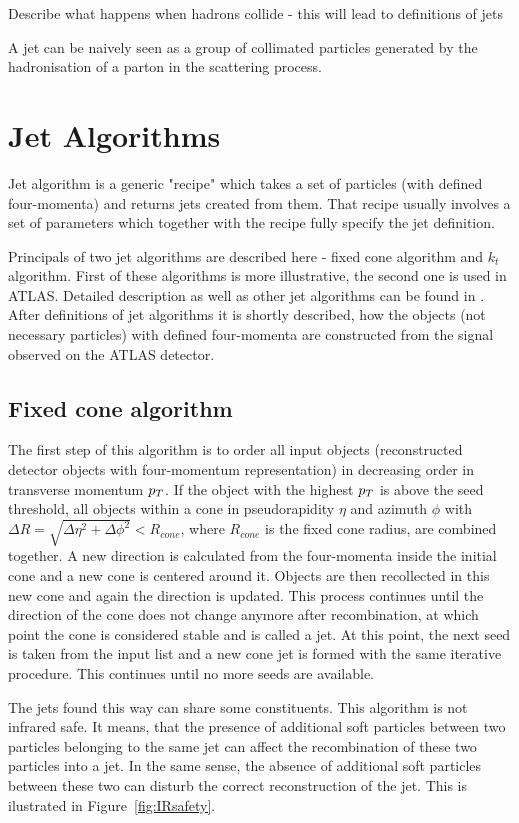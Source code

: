 Describe what happens when hadrons collide - this will lead to definitions of
jets

A jet can be naively seen as a group of collimated particles generated by the
hadronisation of a parton in the scattering process.

\section{Jet Algorithms}

Jet algorithm is a generic "recipe" which takes a set of particles (with defined
four-momenta) and returns jets created from them. That recipe usually involves a
set of parameters which together with the recipe fully specify the jet
definition. 

Principals of two jet algorithms are described here - fixed cone algorithm and
$k_t$ algorithm. First of these algorithms is more illustrative, the second one
is used in ATLAS. Detailed description as well as other jet algorithms can be
found in \cite{ATLASmain}. After definitions of jet algorithms it is shortly
described, how the objects (not necessary particles) with defined four-momenta
are constructed from the signal observed on the ATLAS detector. 

\subsection{Fixed cone algorithm}

The first step of this algorithm is to order all input objects (reconstructed
detector objects with four-momentum representation) in decreasing order in
transverse momentum $p_T$. If the object with the highest $p_T$ is above the
seed threshold, all objects within a cone in pseudorapidity $\eta$ and azimuth
$\phi$ with $\Delta R = \sqrt{\Delta \eta^2 + \Delta \phi^2} < R_{cone}$, where
$R_{cone}$ is the fixed cone radius, are combined together. A new direction is
calculated from the four-momenta inside the initial cone and a new cone is
centered around it. Objects are then recollected in this new cone and again the
direction is updated. This process continues until the direction of the cone
does not change anymore after recombination, at which point the cone is
considered stable and is called a jet. At this point, the next seed is taken
from the input list and a new cone jet is formed with the same iterative
procedure. This continues until no more seeds are available. 

The jets found this way can share some constituents. This algorithm is not
infrared safe. It means, that the presence of additional soft particles between
two particles belonging to the same jet can affect the recombination of these
two particles into a jet. In the same sense, the absence of additional soft
particles between these two can disturb the correct reconstruction of the jet.
This is ilustrated in Figure~\ref{fig:IRsafety}.

